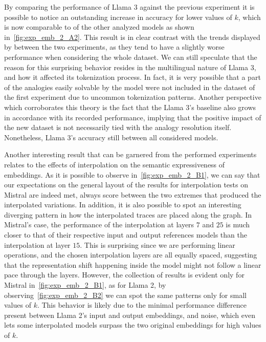 By comparing the performance of Llama 3 against the previous experiment it is possible to notice an outstanding increase in accuracy for lower values of $k$, which is now comparable to  of the other analyzed models as shown in~\cref{fig:exp_emb_2_A2}.
This result is in clear contrast with the trends displayed by  between the two experiments, as they tend to have a slightly worse performance when considering the whole dataset.
We can still speculate that the reason for this surprising behavior resides in the multilingual nature of Llama 3, and how it affected its tokenization process.
In fact, it is very possible that a part of the analogies easily solvable by the model were not included in the dataset of the first experiment due to uncommon tokenization patterns.
Another perspective which corroborates this theory is the fact that the Llama 3's baseline also grows in accordance with its recorded performance, implying that the positive impact of the new dataset is not necessarily tied with the analogy resolution  itself.
Nonetheless, Llama 3's accuracy still  between all considered models. 

Another interesting result that can be garnered from the performed experiments relates to the effects of interpolation on the semantic expressiveness of embeddings.
As it is possible to observe in~\cref{fig:exp_emb_2_B1}, we can say that our expectations on the general layout of the results for interpolation tests on Mistral are indeed met,  always score between the two extremes that produced the interpolated variations.
In addition, it is also possible to spot an interesting diverging pattern in how the interpolated traces are placed along the graph.
In Mistral's case, the performance of the interpolation at layers $7$ and $25$ is much closer to that of their respective input and output references models than the interpolation at layer $15$.
This is surprising since we are performing linear operations, and the chosen interpolation layers are all equally spaced, suggesting that the representation shift happening inside the model might not follow a linear pace through the layers.
However, the  collection of results is evident only for Mistral in~\cref{fig:exp_emb_2_B1}, as for Llama 2, by observing~\cref{fig:exp_emb_2_B2} we can spot the same patterns only for small values of $k$.
This behavior is likely due to the minimal performance difference present between Llama 2's input and output embeddings, and noise, which even lets some interpolated models surpass the two original embeddings for high values of $k$.

